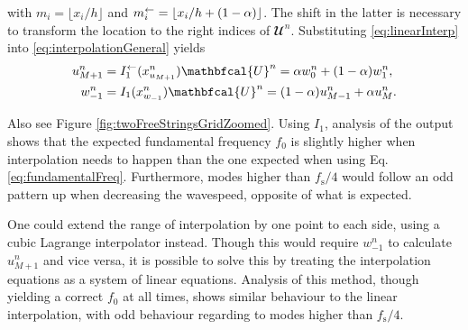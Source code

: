 with $m_i = \lfloor x_i/h\rfloor$ and $m_i^\leftarrow = \lfloor x_i/ h+(1-\alpha) \rfloor$. The shift in the latter is necessary to transform the location to the right indices of $\mathbfcal{U}^n$.  Substituting \eqref{eq:linearInterp} into \eqref{eq:interpolationGeneral} yields
\begin{subequations}
    \begin{align}
        u_{M+1}^n &= I_1^\flip(x^n_{u_{M+1}})\mathbfcal{U}^n = \alpha w_0^n
        + (1-\alpha)w_1^n,\\
        w_{-1}^n &= I_1(x^n_{w_{-1}})\mathbfcal{U}^n = (1-\alpha)u_{M-1}^n + \alpha u_M^n.
    \end{align}
\end{subequations}

Also see Figure \ref{fig:twoFreeStringsGridZoomed}.
%
Using $I_1$, analysis of the output shows that the expected fundamental frequency $f_0$ is slightly higher when interpolation needs to happen than the one expected when using Eq. \eqref{eq:fundamentalFreq}. Furthermore, modes higher than $f_\text{s} / 4$ would follow an odd pattern up when decreasing the wavespeed, opposite of what is expected.

One could extend the range of interpolation by one point to each side, using a cubic Lagrange interpolator instead. Though this would require $w_{-1}^n$ to calculate $u_{M+1}^n$ and vice versa, it is possible to solve this by treating the interpolation equations as a system of linear equations. Analysis of this method, though yielding a correct $f_0$ at all times, shows similar behaviour to the linear interpolation, with odd behaviour regarding to modes higher than $f_\text{s}/4$.

